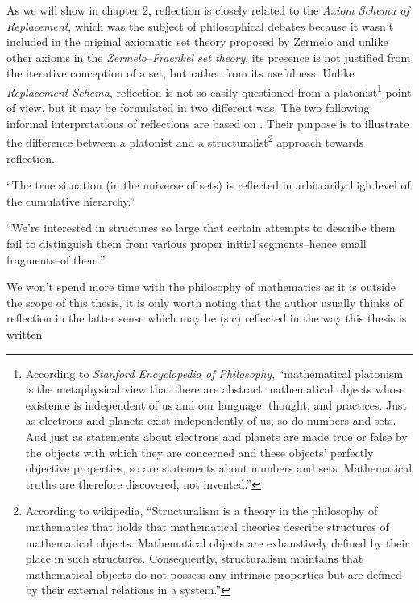 As we will show in chapter 2, reflection is closely related to the \emph{Axiom Schema of Replacement}, which was the subject of philosophical debates because it wasn't included in the original axiomatic set theory proposed by Zermelo and unlike other axioms in the \emph{Zermelo–Fraenkel set theory}, its presence is not justified from the iterative conception of a set, but rather from its usefulness. Unlike \emph{Replacement Schema}, reflection is not so easily questioned from a platonist\footnote{According to \emph{Stanford Encyclopedia of Philosophy}, ``mathematical platonism is the metaphysical view that there are abstract mathematical objects whose existence is independent of us and our language, thought, and practices. Just as electrons and planets exist independently of us, so do numbers and sets. And just as statements about electrons and planets are made true or false by the objects with which they are concerned and these objects' perfectly objective properties, so are statements about numbers and sets. Mathematical truths are therefore discovered, not invented.''} point of view, but it may be formulated in two different was. The two following informal interpretations of reflections are based on \cite{HellmanInfinite}. Their purpose is to illustrate the difference between a platonist and a structuralist\footnote{According to wikipedia, ``Structuralism is a theory in the philosophy of mathematics that holds that mathematical theories describe structures of mathematical objects. Mathematical objects are exhaustively defined by their place in such structures. Consequently, structuralism maintains that mathematical objects do not possess any intrinsic properties but are defined by their external relations in a system.''} approach towards reflection.
\begin{displayquote}
``The true situation (in the universe of sets) is reflected in arbitrarily high level of the cumulative hierarchy.''
\end{displayquote}
\begin{displayquote}
``We're interested in structures so large that certain attempts to describe them fail to distinguish them from various proper initial segments–hence small fragments–of them.''
\end{displayquote}
We won't spend more time with the philosophy of mathematics as it is outside the scope of this thesis, it is only worth noting that the author usually thinks of reflection in the latter sense which may be (sic) reflected in the way this thesis is written. 

